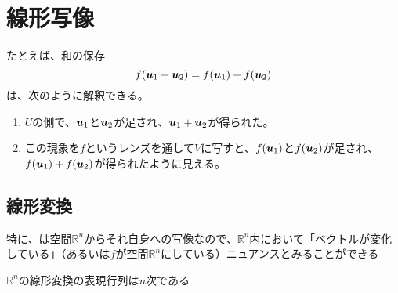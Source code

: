 \documentclass[../../../topic_linear-algebra]{subfiles}
\begin{document}
\sectionline
\section{線形写像}

たとえば、和の保存
\begin{equation*}
  f(\vb*{u}_1 + \vb*{u}_2) = f(\vb*{u}_1) + f(\vb*{u}_2)
\end{equation*}
は、次のように解釈できる。

\begin{enumerate}
  \item $U$の側で、$\vb*{u}_1$と$\vb*{u}_2$が足され、$\vb*{u}_1 + \vb*{u}_2$が得られた。
  \item この現象を$f$というレンズを通して$V$に写すと、$f(\vb*{u}_1)$と$f(\vb*{u}_2)$が足され、$f(\vb*{u}_1) + f(\vb*{u}_2)$が得られたように見える。
\end{enumerate}

\subsection{線形変換}

特に、は空間$\mathbb{R}^n$からそれ自身への写像なので、$\mathbb{R}^n$内において「ベクトルが変化している」（あるいは$f$が空間$\mathbb{R}^n$にしている）ニュアンスとみることができる

$\mathbb{R}^n$の線形変換の表現行列は$n$次である
\end{document}

